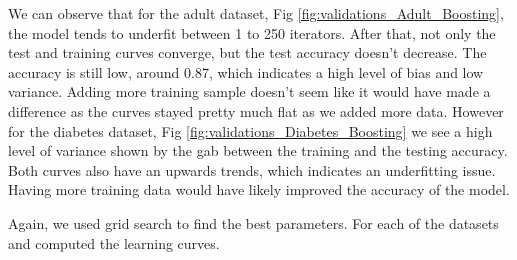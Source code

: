 \documentclass[11pt, twocolumn]{article}
\begin{document}
    We can observe that for the adult dataset, Fig \ref{fig:validations_Adult_Boosting}, the model tends to underfit between 1 to 250 iterators. After that, not only the test and training curves converge, but the test accuracy doesn't decrease. The accuracy is still low, around 0.87, which indicates a high level of bias and low variance. Adding more training sample doesn't seem like it would have made a difference as the curves stayed pretty much flat as we added more data. However for the diabetes dataset, Fig \ref{fig:validations_Diabetes_Boosting} we see a high level of variance shown by the gab between the training and the testing accuracy. Both curves also have an upwards trends, which indicates an underfitting issue. Having more training data would have likely improved the accuracy of the model.

    Again, we used grid search to find the best parameters. For each of the datasets and computed the learning curves.
\end{document}
